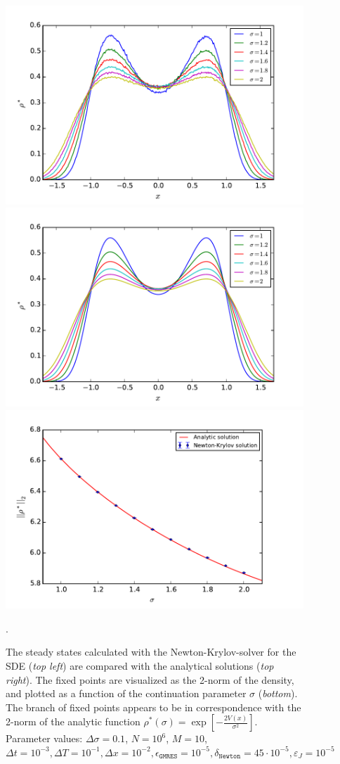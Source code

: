 \begin{figure}[h]
\centering
\includegraphics[width=0.49\linewidth]{../Problems/WeightedParticles/checkSystem/plots/bif/fixed_states_sde(sigma)_Ne6_mean_M10_LR}
\includegraphics[width=0.49\linewidth]{../Problems/WeightedParticles/checkSystem/plots/bif/fixed_states(sigma)_analytic}
\includegraphics[width=0.9\linewidth]{../Problems/WeightedParticles/checkSystem/plots/bif/bifurcation_sde_Ne6_anal(sigma)_LR}
\caption{The steady states calculated with the Newton-Krylov-solver for the SDE  (\textit{top left}) are compared with the analytical solutions (\textit{top right}). The fixed points are visualized as the 2-norm of the density, and plotted as a function of the continuation parameter $\sigma$ (\textit{bottom}). The branch of fixed points appears to be in correspondence with the 2-norm of the analytic function $\rho^*(\sigma) =  \exp{\left[-\frac{2 V(x)}{\sigma^2}\right]} $. %
Parameter values: $\Delta \sigma =0.1$, $N=10^6$, $M=10$, $\Delta t = 10^{-3}, \Delta T = 10^{-1}, \Delta x = 10^{-2}, \epsilon_{\texttt{GMRES}}=10^{-5},  \delta_{\texttt{Newton}} = 45 \cdot 10^{-5}, \varepsilon_J=10^{-5}$}.
\label{fig:fixed_states_sde(sigma)_Ne6_mean_M10_LR}
\end{figure}


